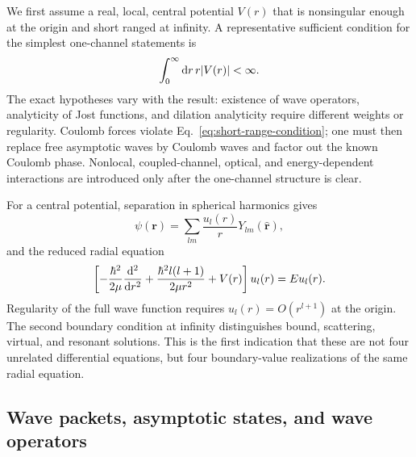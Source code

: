 We first assume a real, local, central potential $V(r)$ that is nonsingular
enough at the origin and short ranged at infinity.  A representative
sufficient condition for the simplest one-channel statements is
\begin{equation}
  \int_0^\infty \mathrm{d} r\,r\lvert V(r)\rvert<\infty .
  \label{eq:short-range-condition}
\end{equation}
The exact hypotheses vary with the result: existence of wave operators,
analyticity of Jost functions, and dilation analyticity require different
weights or regularity.  Coulomb forces violate
Eq.~\eqref{eq:short-range-condition}; one must then replace free asymptotic
waves by Coulomb waves and factor out the known Coulomb phase.  Nonlocal,
coupled-channel, optical, and energy-dependent interactions are introduced
only after the one-channel structure is clear.

For a central potential, separation in spherical harmonics gives
\begin{equation}
  \psi(\bm r)=\sum_{lm}\frac{u_l(r)}{r}Y_{lm}(\widehat{\bm r}),
  \label{eq:partial-wave-decomposition}
\end{equation}
and the reduced radial equation
\begin{equation}
  \left[-\frac{\hbar^2}{2\mu}\frac{\mathrm{d}^2}{\mathrm{d} r^2}
  +\frac{\hbar^2l(l+1)}{2\mu r^2}+V(r)\right]u_l(r)
  =E u_l(r) .
  \label{eq:radial-schrodinger-textbook}
\end{equation}
Regularity of the full wave function requires
$u_l(r)=O(r^{l+1})$ at the origin.  The second boundary condition at infinity
distinguishes bound, scattering, virtual, and resonant solutions.  This is the
first indication that these are not four unrelated differential equations,
but four boundary-value realizations of the same radial equation.

\subsection{Wave packets, asymptotic states, and wave operators}
\label{subsec:wave-packets-operators}


